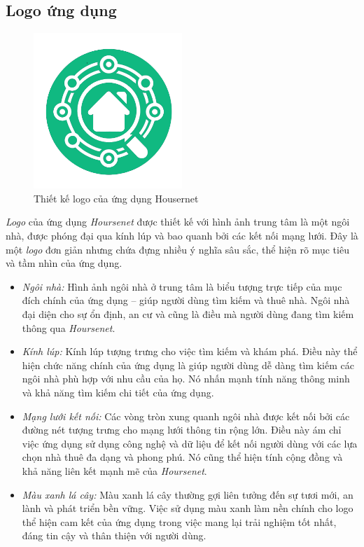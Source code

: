 \subsection{Logo ứng dụng}
\begin{figure}[h]
    \centering
    \includegraphics[width=0.5\textwidth]{Images/LogoHoursenet.png}
    \caption{Thiết kế logo của ứng dụng Housernet}
\end{figure}
\hspace*{1cm}
\textit{Logo} của ứng dụng \textit{Hoursenet} được thiết kế với hình ảnh trung tâm là một ngôi nhà, được phóng đại qua kính lúp và bao quanh bởi các kết nối mạng lưới. Đây là một \textit{logo} đơn giản nhưng chứa đựng nhiều ý nghĩa sâu sắc, thể hiện rõ mục tiêu và tầm nhìn của ứng dụng.
\begin{itemize}
    \item \textit{Ngôi nhà:} Hình ảnh ngôi nhà ở trung tâm là biểu tượng trực tiếp của mục đích chính của ứng dụng – giúp người dùng tìm kiếm và thuê nhà. Ngôi nhà đại diện cho sự ổn định, an cư và cũng là điều mà người dùng đang tìm kiếm thông qua \textit{Hoursenet}.
    \item \textit{Kính lúp:} Kính lúp tượng trưng cho việc tìm kiếm và khám phá. Điều này thể hiện chức năng chính của ứng dụng là giúp người dùng dễ dàng tìm kiếm các ngôi nhà phù hợp với nhu cầu của họ. Nó nhấn mạnh tính năng thông minh và khả năng tìm kiếm chi tiết của ứng dụng.
    \item \textit{Mạng lưới kết nối:} Các vòng tròn xung quanh ngôi nhà được kết nối bởi các đường nét tượng trưng cho mạng lưới thông tin rộng lớn. Điều này ám chỉ việc ứng dụng sử dụng công nghệ và dữ liệu để kết nối người dùng với các lựa chọn nhà thuê đa dạng và phong phú. Nó cũng thể hiện tính cộng đồng và khả năng liên kết mạnh mẽ của \textit{Hoursenet}.
    \item \textit{Màu xanh lá cây:} Màu xanh lá cây thường gợi liên tưởng đến sự tươi mới, an lành và phát triển bền vững. Việc sử dụng màu xanh làm nền chính cho logo thể hiện cam kết của ứng dụng trong việc mang lại trải nghiệm tốt nhất, đáng tin cậy và thân thiện với người dùng.
\end{itemize}
